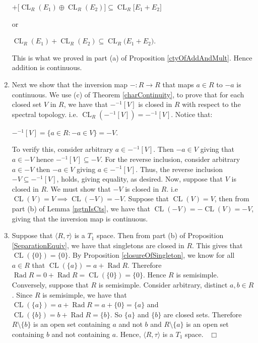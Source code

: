 \documentclass[12pt, oneside]{book}
\newcommand{\qed}{\hfill ~$\Box$\\}
\def\Rad{\operatorname{Rad}}
\def\CL{\operatorname{CL}}
\begin{document}
\begin{enumerate}[label=(\alph*)]
\begin{center}
$+ \big[\CL_R(E_1) \oplus \CL_R(E_2)\big] \subseteq \CL_R\big[E_1 + E_2 \big] $
\end{center}
or
\begin{center}
$\CL_R(E_1) + \CL_R(E_2) \subseteq \CL_R\big(E_1 + E_2 \big).$
\end{center}
This is what we proved in part (a) of Proposition \ref{ctyOfAddAndMult}. Hence addition 
is continuous.
\item Next we show that the inversion map $- : R \to R$ that maps $a \in R$ to $-a$ 
is continuous. 
We use (c) of Theorem \ref{charContinuity}, to prove that for each closed set $V$ in $R$, 
we have that $-^{-1}[V]$ is closed in $R$ with respect to the spectral topology. i.e. 
$\CL_R(-^{-1}[V])=-^{-1}[V]$. Notice that:
\begin{center}
$-^{-1}[V]=\{ a \in R: -a \in V \} = -V$.
\end{center}
\noindent To verify this, consider arbitrary $a \in -^{-1}[V]$. Then $-a \in V$ giving that $a \in -V$ hence $-^{-1}[V] \subseteq -V$. 
For the reverse inclusion, consider arbitrary $a \in -V$ then $-a \in V$ giving $a \in -^{-1}[V]$. 
Thus, the reverse inclusion $-V \subseteq -^{-1}[V]$, holds, giving equality, as desired.
\vskip 0.3cm
\noindent Now, suppose that $V$ is closed in $R$. We must show that $-V$ is closed in $R$. i.e $\CL(V)=V \implies \CL(-V)=-V$.  Suppose that $\CL(V)=V$, then from part (b) of Lemma \ref{ngtnIsCts}, we have that $\CL(-V)=-\CL(V)=-V$, giving that the inversion map is continuous.
\item Suppose that $\langle R, \tau \rangle$ is a $T_1$ space. Then  from part (b) of Proposition 
\ref{SeparationEquiv}, we have that singletons are closed in $R$. 
This gives that $\CL(\{ 0 \}) = \{ 0 \}$. 
By Proposition \ref{closureOfSingleton}, we know for all $a \in R$ that $\CL(\{a\}) = a+\Rad R$. 
Therefore $\Rad R=0+\Rad R=\CL(\{ 0 \}) = \{ 0 \}$. Hence $R$ is semisimple.
\vskip 0.3cm
\noindent Conversely, suppose that $R$ is semisimple. Consider arbitrary, distinct $a,b \in R$. 
Since $R$ is semisimple, we have that $\CL(\{ a \})=a + \Rad R= a + \{ 0 \} = \{ a \}$ and 
$\CL(\{ b \})=b + \Rad R=\{ b \}$. So $\{ a \}$ and $\{ b \}$ are closed sets. 
Therefore $R \setminus \{ b \}$ is an open set containing $a$ and not $b$ and $R \setminus \{ a \}$ is 
an open set containing $b$ and not containing $a$. Hence, $\langle R, \tau \rangle$ is a $T_1$ space.
 \qed
\end{enumerate}
\end{document}

